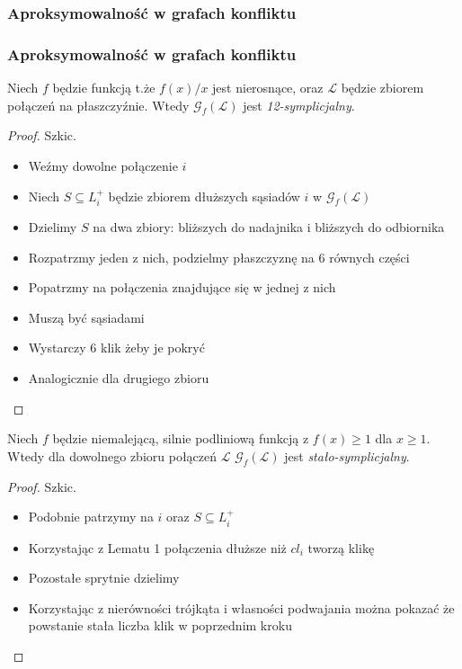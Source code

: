 \documentclass[polish, t,10pt]{beamer}
\begin{document}
\subsubsection{Aproksymowalność w grafach konfliktu}
    \begin{frame}
        \frametitle{Aproksymowalność w grafach konfliktu}
        \begin{theorem}
            Niech $f$ będzie funkcją t.że $f(x)/x$ jest nierosnące, oraz $\mathcal{L}$ będzie zbiorem połączeń na płaszczyźnie. Wtedy $\mathcal{G}_f(\mathcal{L})$ jest \textit{12-symplicjalny}.
        \end{theorem}
        \begin{proof}
            Szkic. \\
            \begin{itemize}
                \item Weźmy dowolne połączenie $i$
                \item Niech $S \subseteq L_i^{+}$ będzie zbiorem dłuższych sąsiadów $i$ w $\mathcal{G}_f(\mathcal{L})$
                \item Dzielimy $S$ na dwa zbiory: bliższych do nadajnika i bliższych do odbiornika
                \item Rozpatrzmy jeden z nich, podzielmy płaszczyznę na 6 równych części
                \item Popatrzmy na połączenia znajdujące się w jednej z nich
                \item Muszą być sąsiadami
                \item Wystarczy 6 klik żeby je pokryć
                \item Analogicznie dla drugiego zbioru
            \end{itemize}
        \end{proof}
    \end{frame}
    \begin{frame}
        \begin{theorem}
            Niech $f$ będzie niemalejącą, silnie podliniową funkcją z $f(x) \ge 1$ dla $x \ge 1$. Wtedy dla dowolnego zbioru połączeń $\mathcal{L}$ $\mathcal{G}_f(\mathcal{L})$ jest \textit{stało-symplicjalny}.
        \end{theorem}
        \begin{proof}
            Szkic.
            \begin{itemize}
                \item Podobnie patrzymy na $i$ oraz $S \subseteq L_i^{+}$
                \item Korzystając z Lematu 1 połączenia dłuższe niż $cl_i$ tworzą klikę
                \item Pozostałe sprytnie dzielimy
                \item Korzystając z nierówności trójkąta i własności podwajania można pokazać że powstanie stała liczba klik w poprzednim kroku
            \end{itemize}
        \end{proof}
    \end{frame}
\end{document}
